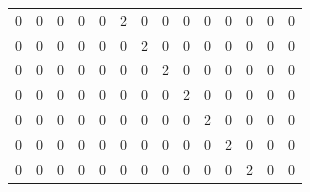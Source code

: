 \documentclass[10pt,twocolumn,letterpaper]{article}
\begin{document}
\begin{table}[h]
\begin{tabular}{llllllllllllll}
0                         & 0                         & 0                         & 0                         & 0                         & \cellcolor[HTML]{9AFF99}2 & 0                         & 0                         & 0                         & 0                         & 0                         & 0                         & 0                         & 0                         \\
0                         & 0                         & 0                         & 0                         & 0                         & 0                         & \cellcolor[HTML]{9AFF99}2 & 0                         & 0                         & 0                         & 0                         & 0                         & 0                         & 0                         \\
0                         & 0                         & 0                         & 0                         & 0                         & 0                         & 0                         & \cellcolor[HTML]{9AFF99}2 & 0                         & 0                         & 0                         & 0                         & 0                         & 0                         \\
0                         & 0                         & 0                         & 0                         & 0                         & 0                         & 0                         & 0                         & \cellcolor[HTML]{9AFF99}2 & 0                         & 0                         & 0                         & 0                         & 0                         \\
0                         & 0                         & 0                         & 0                         & 0                         & 0                         & 0                         & 0                         & 0                         & \cellcolor[HTML]{9AFF99}2 & 0                         & 0                         & 0                         & 0                         \\
0                         & 0                         & 0                         & 0                         & 0                         & 0                         & 0                         & 0                         & 0                         & 0                         & \cellcolor[HTML]{9AFF99}2 & 0                         & 0                         & 0                         \\
0                         & 0                         & 0                         & 0                         & 0                         & 0                         & 0                         & 0                         & 0                         & 0                         & 0                         & \cellcolor[HTML]{9AFF99}2 & 0                         & 0                         \\

\end{tabular}
\end{table}
\end{document}
